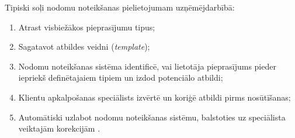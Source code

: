 Tipiski soļi nodomu noteikšanas pielietojumam uzņēmējdarbībā:
\begin{enumerate}
	\item Atrast visbiežākos pieprasījumu tipus;
	\item Sagatavot atbildes veidni (\textit{template});
	\item Nodomu noteikšanas sistēma identificē, vai lietotāja pieprasījums pieder iepriekš definētajaiem tipiem un izdod potenciālo atbildi;
	\item Klientu apkalpošanas speciālists izvērtē un koriģē atbildi pirms nosūtīšanas;
	\item Automātiski uzlabot nodomu noteikšanas sistēmu, balstoties uz speciālista veiktajām korekcijām \cite{paikens2020}.
\end{enumerate}
